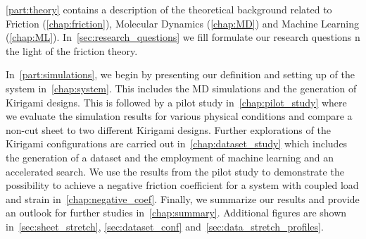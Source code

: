 \cref{part:theory} contains a description of the theoretical background related
to Friction (\cref{chap:friction}), Molecular Dynamics (\cref{chap:MD}) and
Machine Learning (\cref{chap:ML}). In~\cref{sec:research_questions} we fill
formulate our research questions n the light of the friction theory.  

In~\cref{part:simulations}, we begin by presenting our definition and setting up
of the system in~\cref{chap:system}. This includes the \acrshort{MD}
simulations and the generation of Kirigami designs. This is followed by a pilot
study in~\cref{chap:pilot_study} where we evaluate the simulation results for
various physical conditions and compare a non-cut sheet to two different
Kirigami designs. Further explorations of the Kirigami configurations are
carried out in~\cref{chap:dataset_study} which includes the generation of a
dataset and the employment of machine learning and an accelerated search. We use
the results from the pilot study to demonstrate the possibility to achieve a
negative friction coefficient for a system with coupled load and strain
in~\cref{chap:negative_coef}. Finally, we summarize our results and provide an
outlook for further studies in~\cref{chap:summary}. Additional figures are shown
in~\cref{sec:sheet_stretch}, \cref{sec:dataset_conf} and~\cref{sec:data_stretch_profiles}. 










